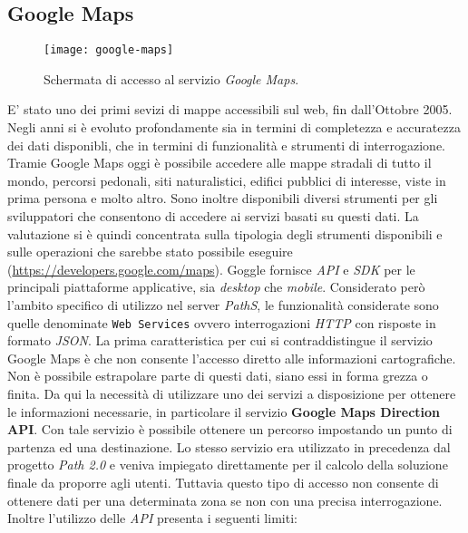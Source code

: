 \subsection{Google Maps}
\begin{figure}[ht]
  \centering
  \texttt{[image: google-maps]}
  \caption{\footnotesize{Schermata di accesso al servizio \emph{Google Maps}.}}
  \label{fig:google-maps}
\end{figure}
E' stato uno dei primi sevizi di mappe accessibili sul web, fin dall'Ottobre 2005. Negli anni si è evoluto profondamente sia in termini di completezza e accuratezza dei dati disponibli, che in termini di funzionalità e strumenti di interrogazione. Tramie Google Maps oggi è possibile accedere alle mappe stradali di tutto il mondo, percorsi pedonali, siti naturalistici, edifici pubblici di interesse, viste in prima persona e molto altro. Sono inoltre disponibili diversi strumenti per gli sviluppatori che consentono di accedere ai servizi basati su questi dati. La valutazione si è quindi concentrata sulla tipologia degli strumenti disponibili e sulle operazioni che sarebbe stato possibile eseguire (\url{https://developers.google.com/maps}).
Goggle fornisce \emph{API} e \emph{SDK} per le principali piattaforme applicative, sia \emph{desktop} che \emph{mobile}. Considerato però l'ambito specifico di utilizzo nel server \emph{PathS}, le funzionalità considerate sono quelle denominate \texttt{Web Services} ovvero interrogazioni \emph{HTTP} con risposte in formato \emph{JSON}. La prima caratteristica per cui si contraddistingue il servizio Google Maps è che non consente l'accesso diretto alle informazioni cartografiche. Non è possibile estrapolare parte di questi dati, siano essi in forma grezza o finita. Da qui la necessità di utilizzare uno dei servizi a disposizione per ottenere le informazioni necessarie, in particolare il servizio \textbf{Google Maps Direction API}. Con tale servizio è possibile ottenere un percorso impostando un punto di partenza ed una destinazione. Lo stesso servizio era utilizzato in precedenza dal progetto \emph{Path 2.0} e veniva impiegato direttamente per il calcolo della soluzione finale da proporre agli utenti. Tuttavia questo tipo di accesso non consente di ottenere dati per una determinata zona se non con una precisa interrogazione. Inoltre l'utilizzo delle \emph{API} presenta i seguenti limiti:
